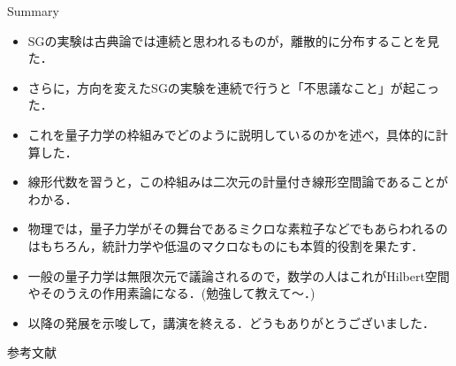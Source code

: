 \documentclass[dvipdfmx]{beamer}
\theoremstyle{break}
\begin{document}
\begin{frame}{Summary}
		\begin{itemize}
				\item SGの実験は古典論では連続と思われるものが，離散的に分布することを見た．
				\item さらに，方向を変えたSGの実験を連続で行うと「不思議なこと」が起こった．

				\item これを量子力学の枠組みでどのように説明しているのかを述べ，具体的に計算した．

				\item 線形代数を習うと，この枠組みは二次元の計量付き線形空間論であることがわかる．
				\item 物理では，量子力学がその舞台であるミクロな素粒子などでもあらわれるのはもちろん，統計力学や低温のマクロなものにも本質的役割を果たす．
				\item 一般の量子力学は無限次元で議論されるので，数学の人はこれがHilbert空間やそのうえの作用素論になる．(勉強して教えて〜．)
				\item 以降の発展を示唆して，講演を終える．どうもありがとうございました．
		\end{itemize}
\end{frame}

\begin{frame}[allowframebreaks]{参考文献}
		\beamertemplatetextbibitems
		
		
\end{frame}
\end{document}
